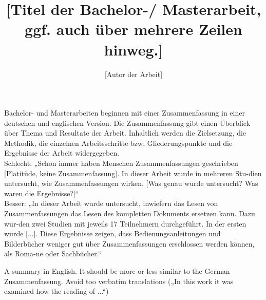 \documentclass{mi-graduation}
\title{[Titel der Bachelor-/ Masterarbeit, ggf. auch über mehrere Zeilen hinweg.]}
\author{[Autor der Arbeit]}
\begin{document}
\maketitle

\pagestyle{empty}

\doublespacing %
\newpage

\tableofcontents %
\newpage
\listoffigures %
\newpage
\lstlistoflistings %
\newpage

\summary
Bachelor- und Masterarbeiten beginnen mit einer Zusammenfassung in einer deutschen und englischen Version. Die Zusammenfassung gibt einen Überblick über Thema und Resultate der Arbeit. Inhaltlich werden die Zielsetzung, die Methodik, die einzelnen Arbeitsschritte bzw. Gliederungspunkte und die Ergebnisse der Arbeit widergegeben.\\
Schlecht: „Schon immer haben Menschen Zusammenfassungen geschrieben [Platitüde, keine Zusammenfassung]. In dieser Arbeit wurde in mehreren Stu-dien untersucht, wie Zusammenfassungen wirken. [Was genau wurde untersucht? Was waren die Ergebnisse?]“\\
Besser: „In dieser Arbeit wurde untersucht, inwiefern das Lesen von Zusammenfassungen das Lesen des kompletten Dokuments ersetzen kann. Dazu wur-den zwei Studien mit jeweils 17 Teilnehmern durchgeführt. In der ersten wurde [...]. Diese Ergebnisse zeigen, dass Bedienungsanleitungen und Bilderbücher weniger gut über Zusammenfassungen erschlossen werden können, als Roma-ne oder Sachbücher.“

\abstract
A summary in English. It should be more or less similar to the German Zusammenfassung. Avoid too verbatim translations („In this work it was examined how the reading of ...“)

\newpage
\pagestyle{fancy}
\end{document}
